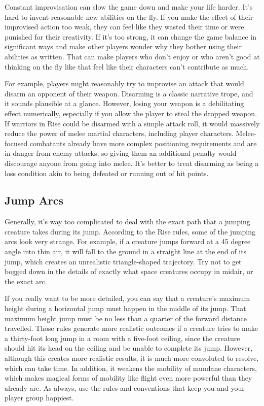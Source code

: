     Constant improvisation can slow the game down and make your life harder.
    It's hard to invent reasonable new abilities on the fly.
    If you make the effect of their improvised action too weak, they can feel like they wasted their time or were punished for their creativity.
    If it's too strong, it can change the game balance in significant ways and make other players wonder why they bother using their abilities as written.
    That can make players who don't enjoy or who aren't good at thinking on the fly like that feel like their characters can't contribute as much.

    For example, players might reasonably try to improvise an attack that would disarm an opponent of their weapon.
    Disarming is a classic narrative trope, and it sounds plausible at a glance.
    However, losing your weapon is a debilitating effect numerically, especially if you allow the player to steal the dropped weapon.
    If warriors in Rise could be disarmed with a simple attack roll, it would massively reduce the power of melee martial characters, including player characters.
    Melee-focused combatants already have more complex positioning requirements and are in danger from enemy attacks, so giving them an additional penalty would discourage anyone from going into melee.
    It's better to treat disarming as being a loss condition akin to being defeated or running out of hit points.

  \subsection{Jump Arcs}
    Generally, it's way too complicated to deal with the exact path that a jumping creature takes during its jump.
    According to the Rise rules, some of the jumping arcs look very strange.
    For example, if a creature jumps forward at a 45 degree angle into thin air, it will fall to the ground in a straight line at the end of its jump, which creates an unrealistic triangle-shaped trajectory.
    Try not to get bogged down in the details of exactly what space creatures occupy in midair, or the exact arc.

    If you really want to be more detailed, you can say that a creature's maximum height during a horizontal jump must happen in the middle of its jump.
    That maximum height jump must be no less than a quarter of the forward distance travelled.
    Those rules generate more realistic outcomes if a creature tries to make a thirty-foot long jump in a room with a five-foot ceiling, since the creature should hit its head on the ceiling and be unable to complete its jump.
    However, although this creates more realistic results, it is much more convoluted to resolve, which can take time.
    In addition, it weakens the mobility of mundane characters, which makes magical forms of mobility like flight even more powerful than they already are.
    As always, use the rules and conventions that keep you and your player group happiest.

